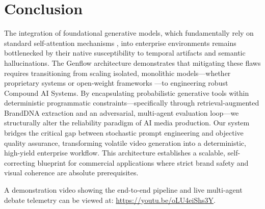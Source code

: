 \documentclass[sigconf,authordraft]{acmart}
\begin{document}
\section{Conclusion}

The integration of foundational generative models, which fundamentally rely on standard self-attention mechanisms \cite{vaswani2017attention}, into enterprise environments remains bottlenecked by their native susceptibility to temporal artifacts and semantic hallucinations. The Genflow architecture demonstrates that mitigating these flaws requires transitioning from scaling isolated, monolithic models---whether proprietary systems \cite{openai2023gpt4} or open-weight frameworks \cite{touvron2023llama}---to engineering robust Compound AI Systems. By encapsulating probabilistic generative tools within deterministic programmatic constraints---specifically through retrieval-augmented BrandDNA extraction and an adversarial, multi-agent evaluation loop---we structurally alter the reliability paradigm of AI media production. Our system bridges the critical gap between stochastic prompt engineering and objective quality assurance, transforming volatile video generation into a deterministic, high-yield enterprise workflow. This architecture establishes a scalable, self-correcting blueprint for commercial applications where strict brand safety and visual coherence are absolute prerequisites.

A demonstration video showing the end-to-end pipeline and live multi-agent debate telemetry can be viewed at: \url{https://youtu.be/oLU4eiShs3Y}.
\end{document}
